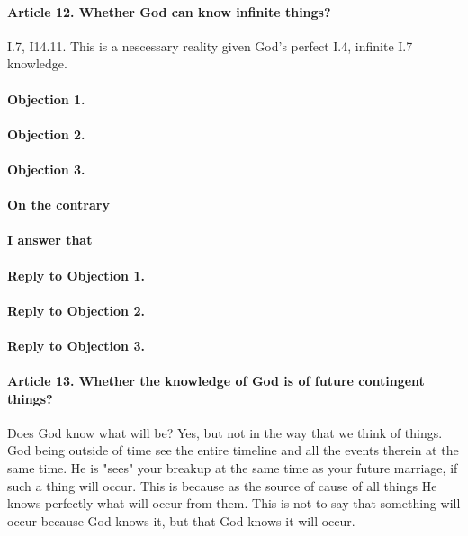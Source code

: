 \documentclass{ucetd}
\begin{document}
\paragraph{Article 12. Whether God can know infinite things?}
I.7, I14.11. This is a nescessary reality given God's perfect I.4, infinite I.7 knowledge.
\paragraph{Objection 1.}
\paragraph{Objection 2.}
\paragraph{Objection 3.}
\paragraph{On the contrary}
\paragraph{I answer that}
\paragraph{Reply to Objection 1.}
\paragraph{Reply to Objection 2.}
\paragraph{Reply to Objection 3.}

\paragraph{Article 13. Whether the knowledge of God is of future contingent things?}
Does God know what will be? Yes, but not in the way that we think of things. God being outside of time see the entire timeline and all the events therein at the same time. He is "sees" your breakup at the same time as your future marriage, if such a thing will occur. This is because as the source of cause of all things He knows perfectly what will occur from them. This is not to say that something will occur because God knows it, but that God knows it will occur.
\end{document}
